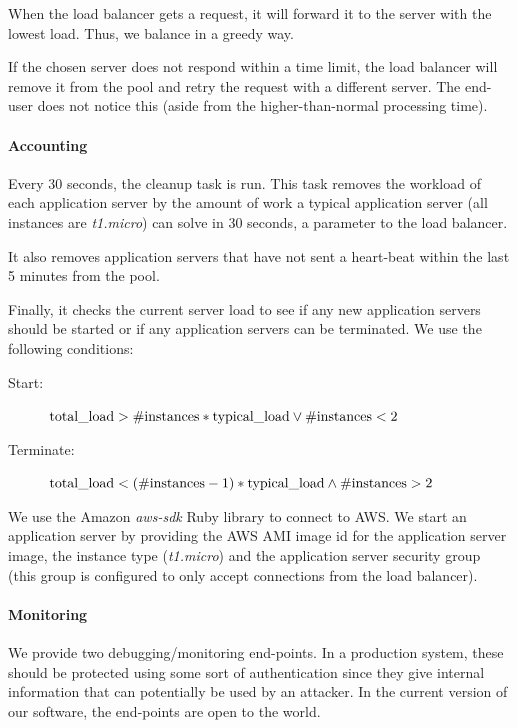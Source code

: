 			When the load balancer gets a request, it will forward it to the server with the lowest load.
			Thus, we balance in a greedy way.
			
			If the chosen server does not respond within a time limit, the load balancer will remove it from the pool and retry the request with a different server.
			The end-user does not notice this (aside from the higher-than-normal processing time).
		
		\paragraph{Accounting}
			\label{sys:arch:load:cleanup}
			Every 30 seconds, the cleanup task is run.
			This task removes the workload of each application server by the amount of work a typical application server (all instances are \textit{t1.micro}) can solve in 30 seconds, a parameter to the load balancer.
			
			It also removes application servers that have not sent a heart-beat within the last 5 minutes from the pool.
			
			Finally, it checks the current server load to see if any new application servers should be started or if any application servers can be terminated.
			We use the following conditions:
			
			\begin{description}
				\item[Start:] $\textnormal{total\_load} > \#\textnormal{instances} * \textnormal{typical\_load} \lor \#\textnormal{instances} < 2$
				\item[Terminate:] $\textnormal{total\_load} < (\#\textnormal{instances} - 1) * \textnormal{typical\_load} \land \#\textnormal{instances} > 2$
			\end{description}
			
			We use the Amazon \textit{aws-sdk} Ruby library to connect to AWS.
			We start an application server by providing the AWS AMI image id for the application server image,
			the instance type (\textit{t1.micro}) and the application server security group (this group is configured to only accept connections from the load balancer).
		
		\paragraph{Monitoring}
			We provide two debugging/monitoring end-points.
			In a production system, these should be protected using some sort of authentication since they give internal information that can potentially be used by an attacker.
			In the current version of our software, the end-points are open to the world.
			
